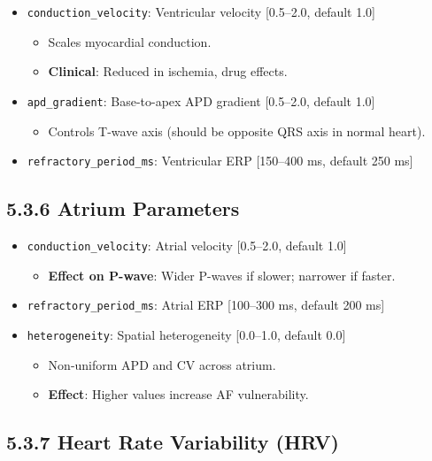 \documentclass[12pt,oneside,a4paper]{book}
\newcommand{\code}[1]{\texttt{#1}}
\begin{document}
\begin{itemize}
  \item \code{conduction\_velocity}: Ventricular velocity [0.5--2.0, default 1.0]
    \begin{itemize}
      \item Scales myocardial conduction.
      \item \textbf{Clinical}: Reduced in ischemia, drug effects.
    \end{itemize}
  \item \code{apd\_gradient}: Base-to-apex APD gradient [0.5--2.0, default 1.0]
    \begin{itemize}
      \item Controls T-wave axis (should be opposite QRS axis in normal heart).
    \end{itemize}
  \item \code{refractory\_period\_ms}: Ventricular ERP [150--400 ms, default 250 ms]
\end{itemize}

\subsection{5.3.6 Atrium Parameters}

\begin{itemize}
  \item \code{conduction\_velocity}: Atrial velocity [0.5--2.0, default 1.0]
    \begin{itemize}
      \item \textbf{Effect on P-wave}: Wider P-waves if slower; narrower if faster.
    \end{itemize}
  \item \code{refractory\_period\_ms}: Atrial ERP [100--300 ms, default 200 ms]
  \item \code{heterogeneity}: Spatial heterogeneity [0.0--1.0, default 0.0]
    \begin{itemize}
      \item Non-uniform APD and CV across atrium.
      \item \textbf{Effect}: Higher values increase AF vulnerability.
    \end{itemize}
\end{itemize}

\subsection{5.3.7 Heart Rate Variability (HRV)}
\end{document}
